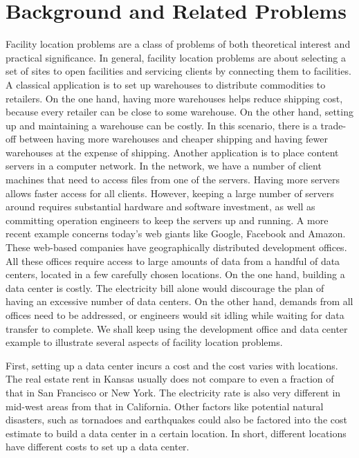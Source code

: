 \documentclass[oneside,final]{ucr}
\begin{document}
\section{Background and Related Problems}
Facility location problems are a class of problems of both
theoretical interest and practical significance. In general,
facility location problems are about selecting a set of
sites to open facilities and servicing clients by connecting
them to facilities. A classical application is to set up
warehouses to distribute commodities to retailers. On the
one hand, having more warehouses helps reduce shipping cost,
because every retailer can be close to some warehouse. On
the other hand, setting up and maintaining a warehouse can
be costly. In this scenario, there is a trade-off between
having more warehouses and cheaper shipping and having fewer
warehouses at the expense of shipping. Another application
is to place content servers in a computer network. In the
network, we have a number of client machines that need to
access files from one of the servers. Having more servers
allows faster access for all clients. However, keeping a
large number of servers around requires substantial hardware
and software investment, as well as committing operation
engineers to keep the servers up and running. A more recent
example concerns today's web giants like Google, Facebook
and Amazon. These web-based companies have geographically
distributed development offices. All these offices require
access to large amounts of data from a handful of data
centers, located in a few carefully chosen locations. On the
one hand, building a data center is costly. The electricity
bill alone would discourage the plan of having an excessive
number of data centers. On the other hand, demands from all
offices need to be addressed, or engineers would sit idling
while waiting for data transfer to complete. We shall keep
using the development office and data center example to
illustrate several aspects of facility location problems.

First, setting up a data center incurs a cost and the cost
varies with locations. The real estate rent in Kansas
usually does not compare to even a fraction of that in San
Francisco or New York. The electricity rate is also very
different in mid-west areas from that in California. Other
factors like potential natural disasters, such as tornadoes
and earthquakes could also be factored into the cost
estimate to build a data center in a certain location. In
short, different locations have different costs to set up a
data center.
\end{document}
